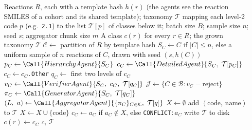 \begin{algorithm}[t]
\caption{Cohort-level reaction classification with taxonomy growth}
\label{alg:pipeline}
\begin{algorithmic}[1]
\Require Reactions $R$, each with a template hash $h(r)$ (the agents see the reaction SMILES of a cohort and its shared template); taxonomy $\mathcal{T}$ mapping each level-2 code $p$ (e.g.\ \texttt{2.1}) to the list $\mathcal{T}[p]$ of classes below it; batch size $B$; sample size $n$; seed $s$; aggregator chunk size $m$
\Ensure A class $c(r)$ for every $r \in R$; the grown taxonomy $\mathcal{T}$
\State $\mathcal{C} \gets$ partition of $R$ by template hash 
  \State $S_C \gets C$ if $|C| \le n$, else a uniform sample of $n$ reactions of $C$, drawn with seed $(s, h(C))$
\EndFor
{}
   
    \State $p_C \gets \Call{HierarchyAgent}{S_C}$ 
    \State $c_C \gets \Call{DetailedAgent}{S_C,\ \mathcal{T}[p_C]}$ 
      \State $c_C \gets c_C$\texttt{.Other}
    \EndIf
    \State $q_C \gets$ first two levels of $c_C$
    \State $v_C \gets \Call{VerifierAgent}{S_C,\ c_C,\ \mathcal{T}[q_C]}$ 
  \EndFor
  \State $\mathcal{J} \gets \{C \in \mathcal{B} : v_C = \text{reject}\}$ 
    \State $\pi_C \gets \Call{GeneratorAgent}{S_C,\ \mathcal{T}[q_C]}$ 
  \EndFor
      \State $(L,\ a) \gets \Call{AggregatorAgent}{\{\pi_C\}_{C \in \mathcal{K}},\ \mathcal{T}[q]}$ 
      \State $X \gets \emptyset$
          \State add $(\text{code},\ \text{name})$ to $\mathcal{T}$ 
          \State $X \gets X \cup \{\text{code}\}$ 
        \EndIf
      \EndFor
        \State $c_C \gets a_C$ if $a_C \notin X$, else \texttt{CONFLICT:}$a_C$
      \EndFor
    \EndFor
  \EndFor
  \State write $\mathcal{T}$ to disk
\EndFor
{}
  \State $c(r) \gets c_C$ 
\EndFor
\State \Return $c,\ \mathcal{T}$
\end{algorithmic}
\end{algorithm}

